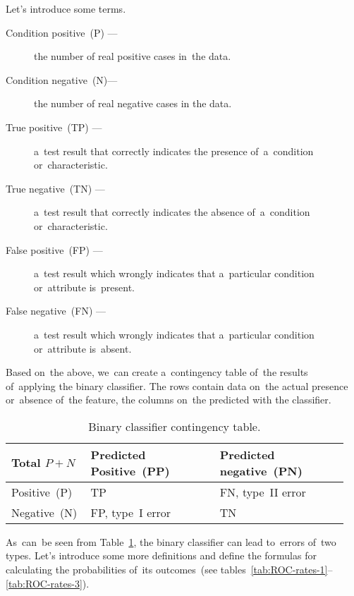 \documentclass[]{scrreprt}
\begin{document}
Let's introduce some terms.
\begin{description}
	\item[Condition positive~(P) --- ] the number of real positive cases in~the data.
	\item[Condition negative~(N)---] the number of real negative cases in the data.
	\item[True positive~(TP) ---] a~test result that correctly indicates the presence of~a~condition or~characteristic.
	\item[True negative~(TN) ---] a~test result that correctly indicates the absence of~a~condition or~characteristic.
	\item[False positive~(FP) ---] a~test result which wrongly indicates that a~particular condition or~attribute is~present.
	\item[False negative~(FN) ---] a~test result which wrongly indicates that a~particular condition or~attribute is~absent.
\end{description}
Based on~the above, we~can create a~contingency table of~the results of~applying the binary classifier. The rows contain data on~the actual presence or~absence of~the feature, the columns on~the predicted with the classifier.
%
\begin{table}[htp]
	\caption{Binary classifier contingency table.}  \label{tab:ROC-contingency-table}
	\centering
	\begin{tabularx}{\textwidth}{p{0.2\linewidth} p{0.375\linewidth} p{0.375\linewidth}} 
		\hline
	Total $P+N$&Predicted Positive~(PP)&Predicted negative~(PN)\\
		\hline
		Positive~(P)&TP&FN, type~II error~\cite{Wiki:type-1-2-errors}\\
		\hline
		Negative~(N)&FP, type~I error~\cite{Wiki:type-1-2-errors}&TN\\
		\hline
	\end{tabularx}
\end{table}
%
As~can~be seen from Table~\ref{tab:ROC-contingency-table}, the binary classifier can lead to~errors of~two types. Let's introduce some more definitions and define the formulas for calculating the probabilities of~its outcomes~(see tables~\ref{tab:ROC-rates-1}--\ref{tab:ROC-rates-3}).
%
\end{document}
